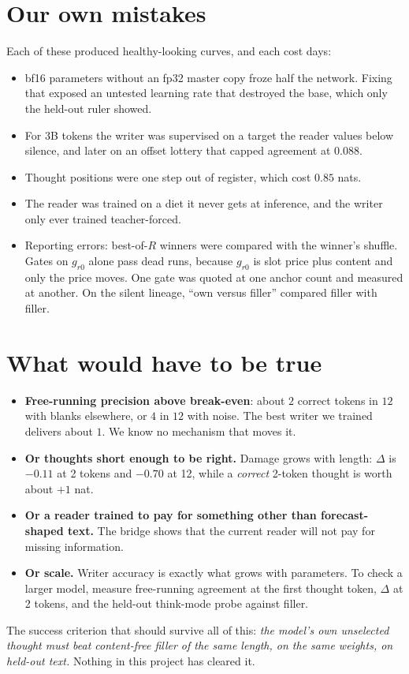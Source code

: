 \documentclass[11pt]{article}
\begin{document}
\section{Our own mistakes}
Each of these produced healthy-looking curves, and each cost days:
\begin{itemize}\setlength{\itemsep}{1pt}
\item bf16 parameters without an fp32 master copy froze half the network. Fixing that exposed an untested learning rate that destroyed the base, which only the held-out ruler showed.
\item For 3B tokens the writer was supervised on a target the reader values below silence, and later on an offset lottery that capped agreement at $0.088$.
\item Thought positions were one step out of register, which cost $0.85$ nats.
\item The reader was trained on a diet it never gets at inference, and the writer only ever trained teacher-forced.
\item Reporting errors: best-of-$R$ winners were compared with the winner's shuffle. Gates on $g_{r0}$ alone pass dead runs, because $g_{r0}$ is slot price plus content and only the price moves. One gate was quoted at one anchor count and measured at another. On the silent lineage, ``own versus filler'' compared filler with filler.
\end{itemize}

\section{What would have to be true}
\begin{itemize}\setlength{\itemsep}{1pt}
\item \textbf{Free-running precision above break-even}: about $2$ correct tokens in $12$ with blanks elsewhere, or $4$ in $12$ with noise. The best writer we trained delivers about $1$. We know no mechanism that moves it.
\item \textbf{Or thoughts short enough to be right.} Damage grows with length: $\Delta$ is $-0.11$ at 2 tokens and $-0.70$ at 12, while a \emph{correct} 2-token thought is worth about $+1$ nat.
\item \textbf{Or a reader trained to pay for something other than forecast-shaped text.} The bridge shows that the current reader will not pay for missing information.
\item \textbf{Or scale.} Writer accuracy is exactly what grows with parameters. To check a larger model, measure free-running agreement at the first thought token, $\Delta$ at 2 tokens, and the held-out think-mode probe against filler.
\end{itemize}
The success criterion that should survive all of this: \emph{the model's own unselected thought must beat content-free filler of the same length, on the same weights, on held-out text.} Nothing in this project has cleared it.
\end{document}
